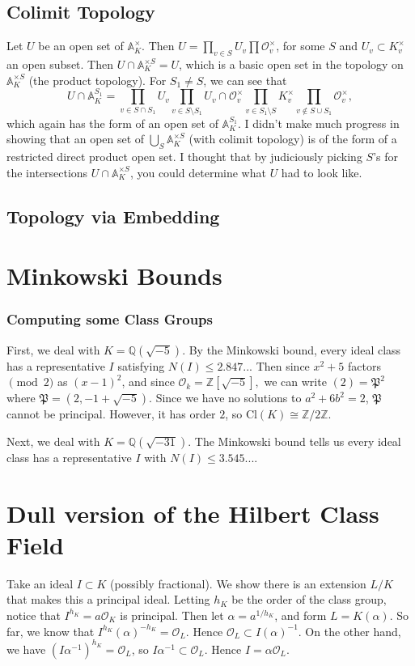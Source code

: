 \documentclass[11pt]{amsart}
\theoremstyle{named}
\newcommand{\cl}[1]{{\mathrm{Cl}(#1)}}
\newcommand{\roi}[1]{\mathcal{O}_{#1}}
\newcommand{\rats}{\mathbb{Q}}
\newcommand{\Zmod}[1]{\mathbb{Z}/#1 \mathbb{Z}}
\newcommand{\sidele}{\mathbb{A}_K^{\times S}}
\newcommand{\idele}{\mathbb{A}_K^{\times}}
\begin{document}
\subsection{Colimit Topology} Let $U$ be an open set of $\idele$. Then $U = \prod_{v \in S} U_v \prod \mathcal{O}_v^\times$, for some $S$ and $U_v \subset K_v^\times$ an open subset. Then $U \cap \sidele = U$, which is a basic open set in the topology on $\sidele$ (the product topology). For $S_1 \neq S$, we can see that \[U \cap \mathbb{A}_K^{S_1} = \prod_{v \in S \cap S_1} U_v \prod_{v \in S \setminus S_1} U_v \cap \mathcal{O}_v^\times \prod_{v \in S_1 \setminus S} K_v^\times \prod_{v \not\in S \cup S_1} \mathcal{O}_v^\times,\] which again has the form of an open set of $\mathbb{A}_K^{S_1}$. I didn't make much progress in showing that an open set of $\bigcup_S \sidele$ (with colimit topology) is of the form of a restricted direct product open set. I thought that by judiciously picking $S$'s for the intersections $U \cap \sidele$, you could determine what $U$ had to look like.

\subsection{Topology via Embedding}

\section{Minkowski Bounds}
\subsubsection{Computing some Class Groups} First, we deal with $K = \rats(\sqrt{-5}).$ By the Minkowski bound, every ideal class has a representative $I$ satisfying $N(I) \leq 2.847...$ Then since $x^2 + 5$ factors $\pmod 2$ as $(x - 1)^2$, and since $\mathcal{O}_k = \mathbb{Z}[\sqrt{-5}],$ we can write $(2) = \mathfrak{P}^2$ where $\mathfrak{P} = (2, -1 + \sqrt{-5})$. Since we have no solutions to $a^2 + 6b^2 = 2$, $\mathfrak{P}$ cannot be principal. However, it has order $2$, so $\cl K \cong \Zmod 2.$

Next, we deal with $K = \rats(\sqrt{-31}).$ The Minkowski bound tells us every ideal class has a representative $I$ with $N(I) \leq 3.545...$. 

\section{Dull version of the Hilbert Class Field} Take an ideal $I \subset K$ (possibly fractional). We show there is an extension $L/K$ that makes this a principal ideal. Letting $h_K$ be the order of the class group, notice that $I^{h_K} = a \roi K$ is principal. Then let $\alpha = a^{1/h_K}$, and form $L = K(\alpha)$. So far, we know that $I^{h_K} (\alpha)^{-h_K} = \mathcal{O}_L$. Hence $\mathcal{O}_L \subset I (\alpha)^{-1}$. On the other hand, we have $(I \alpha^{-1})^{h_K} = \mathcal{O}_L$, so $I \alpha^{-1} \subset \mathcal{O}_L.$ Hence $I = \alpha \mathcal{O}_L$.
\end{document}

